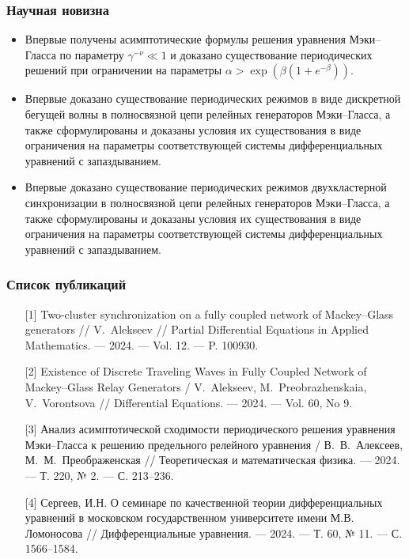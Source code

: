\begin{frame}
    \frametitle{Научная новизна}
    \begin{itemize}
    	\item Впервые получены асимптотические формулы решения уравнения Мэки--Гласса по параметру $\gamma^{-\nu} \ll 1$ и доказано существование периодических решений при ограничении на параметры $\alpha > \exp\left(\beta(1 + e^{-\beta})\right)$.
    	\item Впервые доказано существование периодических режимов в виде дискретной бегущей волны в полносвязной цепи релейных генераторов Мэки--Гласса, а также сформулированы и доказаны условия их существования в виде ограничения на параметры соответствующей системы дифференциальных уравнений с запаздыванием.
    	\item Впервые доказано существование периодических режимов двухкластерной синхронизации в полносвязной цепи релейных генераторов Мэки--Гласса, а также сформулированы и доказаны условия их существования в виде ограничения на параметры соответствующей системы дифференциальных уравнений с запаздыванием.
    \end{itemize}
\end{frame}

\begin{frame} %
	\frametitle{Список публикаций}
	\begin{itemize}
		\item[{[1]}] Two-cluster synchronization on a fully coupled network of Mackey--Glass generators // V.~Alekseev // Partial Differential Equations in Applied Mathematics. --- 2024. --- Vol. 12. --- P. 100930.
		\item[{[2]}] Existence of Discrete Traveling Waves in Fully Coupled Network of Mackey--Glass Relay Generators / V.~Alekseev, M.~Preobrazhenskaia, V.~Vorontsova // Differential Equations. --- 2024. --- Vol. 60, No 9.
		\item[{[3]}] Анализ асимптотической сходимости периодического решения уравнения Мэки--Гласса к решению предельного релейного уравнения / В.~В.~Алексеев, М.~М.~Преображенская // Теоретическая и математическая физика. --- 2024. --- Т. 220, № 2. --- С. 213--236.
		\item[{[4]}] Сергеев, И.Н. О семинаре по качественной теории дифференциальных уравнений в московском государственном университете имени М.В. Ломоносова // Дифференциальные уравнения. --- 2024. --- Т. 60, № 11. --- С. 1566--1584.
    \end{itemize}
\end{frame}

